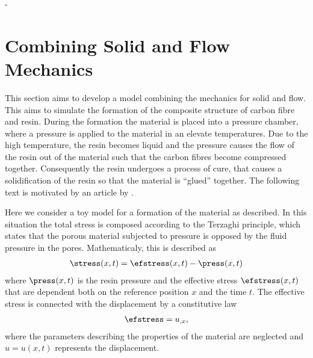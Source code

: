 \documentclass[twoside,a4paper,12pt]{article}
\newcommand{\note}[1]{}
\begin{document}
-\note{it remains to explain the element-wise construction of the stiffness matrix}

\section{Combining Solid and Flow Mechanics}

This section aims to develop a model combining the mechanics for solid
and flow. This aims to simulate the formation of the composite
structure of carbon fibre and resin. During the formation the material
is placed into a pressure chamber, where a pressure is applied to the
material in an elevate temperatures. Due to the high temperature, the
resin becomes liquid and the pressure causes the flow of the resin out
of the material such that the carbon fibres become compressed
together. Consequently the resin undergoes a process of cure, that
causes a solidification of the resin so that the material is ``glued''
together. The following text is motivated by an article by
\citet{Hubert1999}.

Here we consider a toy model for a formation of the material as
described.  In this situation the total stress is composed according
to the Terzaghi principle, which states that the porous material
subjected to pressure is opposed by the fluid pressure in the
pores. Mathematicaly, this is described as
%
\begin{align}
\stress(x,t) = \efstress(x,t) - \press(x,t) \label{eq:flow-stress}
\end{align}
%
where $\press(x,t)$ is the resin pressure and the effective stress
$\efstress(x,t)$ that are dependent both on the reference position $x$ and
the time $t$. The effective stress is connected with the
displacement by a constitutive law
\begin{align}
\efstress = u_{,x},
\end{align}
%
where the parameters describing the properties of the material are
neglected and $u= u(x,t)$ represents the displacement.
\end{document}
